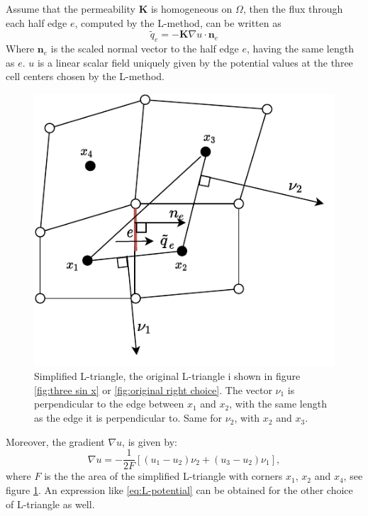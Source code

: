 \documentclass[../Main/main.tex]{subfiles}
\begin{document}
	\begin{lemma} \label{lemma:L_potential}
		Assume that the permeability $\bm{K}$ is homogeneous on $\Omega$, then the flux through each half edge $e$, computed by the L-method, can be written as
		\begin{equation}\label{eq:L flux simplified}
			\tilde{q}_e = -\bm{K} \nabla u \cdot \bm{n}_e
		\end{equation}
		Where $\bm{n}_e$ is the scaled normal vector to the half edge $e$, having the same length as $e$. $u$ is a linear scalar field uniquely given by the potential values at the three cell centers chosen by the L-method.
		\begin{figure}[H]
			\centering
			\includegraphics{Right choice linear potential.pdf}
			\caption{Simplified L-triangle, the original L-triangle i shown in figure \ref{fig:three sin x} or \ref{fig:original right choice}. The vector $\nu_1$ is perpendicular to the edge between $x_1$ and $x_2$, with the same length as the edge it is perpendicular to. Same for $\nu_2$, with $x_2$ and $x_3$.}
			\label{fig:L-triangle-potential}
		\end{figure}
		Moreover, the gradient $\nabla u$, is given by:
		\begin{equation}\label{eq:L-potential}
			\nabla u = -\frac{1}{2F}[(u_1 - u_2)\nu_2 + (u_3 - u_2)\nu_1 ],
		\end{equation}
		where $F$ is the the area of the simplified L-triangle with corners $x_1$, $x_2$ and $x_4$, see figure  \ref{fig:L-triangle-potential}. An expression like \eqref{eq:L-potential} can be obtained for the other choice of L-triangle as well.
	\end{lemma}
\end{document}
